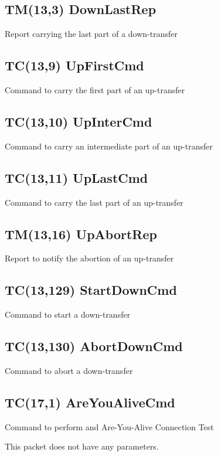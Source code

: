 \pagebreak
\subsection{TM(13,3) DownLastRep}
Report carrying the last part of a down-transfer

\pagebreak
\subsection{TC(13,9) UpFirstCmd}
Command to carry the first part of an up-transfer

\pagebreak
\subsection{TC(13,10) UpInterCmd}
Command to carry an intermediate part of an up-transfer

\pagebreak
\subsection{TC(13,11) UpLastCmd}
Command to carry the last part of an up-transfer

\pagebreak
\subsection{TM(13,16) UpAbortRep}
Report to notify the abortion of an up-transfer

\pagebreak
\subsection{TC(13,129) StartDownCmd}
Command to start a down-transfer

\pagebreak
\subsection{TC(13,130) AbortDownCmd}
Command to abort a down-transfer

\pagebreak
\subsection{TC(17,1) AreYouAliveCmd}
Command to perform and Are-You-Alive Connection Test

This packet does not have any parameters.

